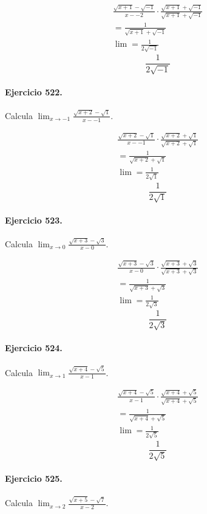 \documentclass[11pt,a4paper]{article}
\begin{document}
\[
\begin{aligned}
\frac{\sqrt{x+1}-\sqrt{-1}}{x--2}\cdot \frac{\sqrt{x+1}+\sqrt{-1}}{\sqrt{x+1}+\sqrt{-1}}\\
=\frac{1}{\sqrt{x+1}+\sqrt{-1}}\\
\lim=\frac{1}{2\sqrt{-1}}
\end{aligned}
\]
\[\boxed{\frac{1}{2\sqrt{-1}}}\]


\paragraph{Ejercicio 522.} Calcula $\displaystyle\lim_{x\to -1}\frac{\sqrt{x+2}-\sqrt{1}}{x--1}$.

\[
\begin{aligned}
\frac{\sqrt{x+2}-\sqrt{1}}{x--1}\cdot \frac{\sqrt{x+2}+\sqrt{1}}{\sqrt{x+2}+\sqrt{1}}\\
=\frac{1}{\sqrt{x+2}+\sqrt{1}}\\
\lim=\frac{1}{2\sqrt{1}}
\end{aligned}
\]
\[\boxed{\frac{1}{2\sqrt{1}}}\]


\paragraph{Ejercicio 523.} Calcula $\displaystyle\lim_{x\to 0}\frac{\sqrt{x+3}-\sqrt{3}}{x-0}$.

\[
\begin{aligned}
\frac{\sqrt{x+3}-\sqrt{3}}{x-0}\cdot \frac{\sqrt{x+3}+\sqrt{3}}{\sqrt{x+3}+\sqrt{3}}\\
=\frac{1}{\sqrt{x+3}+\sqrt{3}}\\
\lim=\frac{1}{2\sqrt{3}}
\end{aligned}
\]
\[\boxed{\frac{1}{2\sqrt{3}}}\]


\paragraph{Ejercicio 524.} Calcula $\displaystyle\lim_{x\to 1}\frac{\sqrt{x+4}-\sqrt{5}}{x-1}$.

\[
\begin{aligned}
\frac{\sqrt{x+4}-\sqrt{5}}{x-1}\cdot \frac{\sqrt{x+4}+\sqrt{5}}{\sqrt{x+4}+\sqrt{5}}\\
=\frac{1}{\sqrt{x+4}+\sqrt{5}}\\
\lim=\frac{1}{2\sqrt{5}}
\end{aligned}
\]
\[\boxed{\frac{1}{2\sqrt{5}}}\]


\paragraph{Ejercicio 525.} Calcula $\displaystyle\lim_{x\to 2}\frac{\sqrt{x+5}-\sqrt{7}}{x-2}$.
\end{document}

